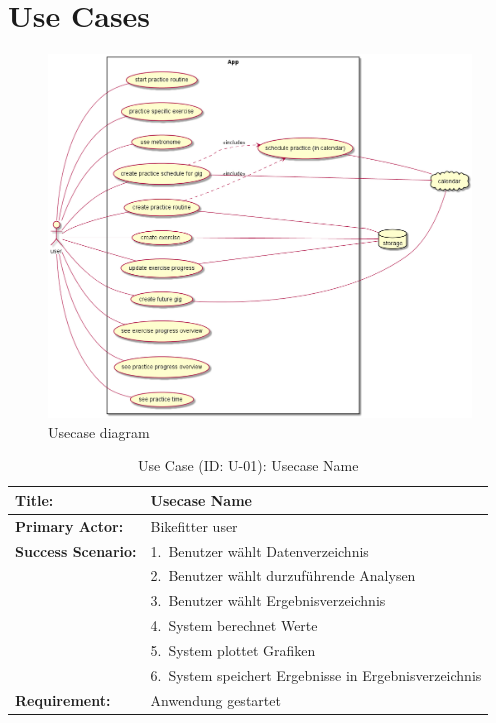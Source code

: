 \documentclass[12pt,a4paper]{report}
\begin{document}
\section{Use Cases}
\begin{figure}[htp]
\includegraphics[width=12cm]{usecases1.png}
\caption{Usecase diagram}
\end{figure}

\begin{table}[htp]
\caption{Use Case (ID: U-01): Usecase Name}\label{U-01}
\begin{tabular}{lp{10cm}}
  \hline
  \textbf{Title:}             & Usecase Name \\
  \hline
  \textbf{Primary Actor:}     & Bikefitter \/ user \\
  \hline
  \textbf{Success Scenario:}  & 1.~Benutzer wählt Datenverzeichnis \\
                              & 2.~Benutzer wählt durzuführende Analysen \\
                              & 3.~Benutzer wählt Ergebnisverzeichnis \\
                              & 4.~System berechnet Werte \\
                              & 5.~System plottet Grafiken \\
                              & 6.~System speichert Ergebnisse in Ergebnisverzeichnis \\
  \hline
  \textbf{Requirement:}       & Anwendung gestartet \\
  \hline
\end{tabular}
\end{table}

\begin{appendix}
  \listoftables
\end{appendix}
\end{document}
